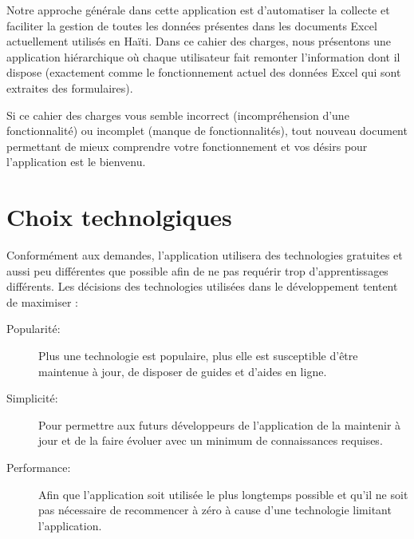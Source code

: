 \documentclass[a4paper, 11pt]{article}
\begin{document}
  Notre approche générale dans cette application est d'automatiser la collecte et faciliter la gestion de toutes les données présentes dans les documents Excel actuellement utilisés en Haïti. Dans ce cahier des charges, nous présentons une application hiérarchique où chaque utilisateur fait remonter l'information dont il dispose (exactement comme le fonctionnement actuel des données Excel qui sont extraites des formulaires).

  \begin{shaded}
    Si ce cahier des charges vous semble incorrect (incompréhension d'une fonctionnalité) ou incomplet (manque de fonctionnalités), tout nouveau document permettant de mieux comprendre votre fonctionnement et vos désirs pour l'application est le bienvenu.
  \end{shaded}

\section{Choix technolgiques}
  Conformément aux demandes, l'application utilisera des technologies gratuites et aussi peu différentes que possible afin de ne pas requérir trop d'apprentissages différents. Les décisions des technologies utilisées dans le développement tentent de maximiser :
  \begin{description}
    \item[Popularité:] Plus une technologie est populaire, plus elle est susceptible d'être maintenue à jour, de disposer de guides et d'aides en ligne.
    \item[Simplicité:] Pour permettre aux futurs développeurs de l'application de la maintenir à jour et de la faire évoluer avec un minimum de connaissances requises.
    \item[Performance:] Afin que l'application soit utilisée le plus longtemps possible et qu'il ne soit pas nécessaire de recommencer à zéro à cause d'une technologie limitant l'application.
  \end{description}
\end{document}
